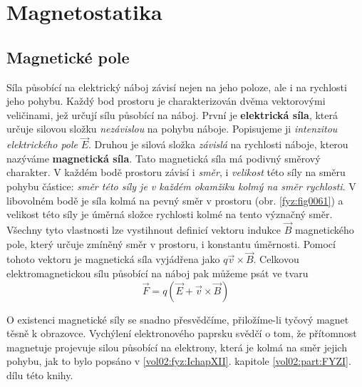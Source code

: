 \setchaptertoc
\chapter{Magnetostatika}\label{fyz:IIchapXIII}


  \section{Magnetické pole}\label{fyz:IIchapXIIIsecI}
    \cite[s.~224]{Feynman02} Síla působící na elektrický náboj závisí nejen na jeho poloze, ale i 
    na rychlosti jeho pohybu. Každý bod prostoru je charakterizován dvěma vektorovými veličinami, 
    jež určují sílu působící na náboj. První je \textbf{elektrická síla}, která určuje silovou 
    složku \emph{nezávislou} na pohybu náboje. Popisujeme ji \emph{intenzitou elektrického pole} 
    \(\vec{E}\). Druhou je silová složka \emph{závislá} na rychlosti náboje, kterou nazýváme 
    \textbf{magnetická síla}. Tato magnetická síla má podivný směrový charakter. V každém bodě 
    prostoru závisí i \emph{směr}, i \emph{velikost} této síly na směru pohybu částice: \emph{směr 
    této síly je v každém okamžiku kolmý na směr rychlosti}. V libovolném bodě je síla kolmá na 
    pevný směr v prostoru (obr. \ref{fyz:fig0061}) a velikost této síly je úměrná složce 
    rychlosti kolmé na tento význačný směr. Všechny tyto vlastnosti lze vystihnout definicí vektoru 
    indukce \(\vec{B}\) magnetického pole, který určuje zmíněný směr v prostoru, i konstantu 
    úměrnosti. Pomocí tohoto vektoru je magnetická síla vyjádřena jako \(q\vec{v}\times\vec{B}\).
    Celkovou elektromagnetickou sílu působící na náboj pak můžeme psát ve tvaru
    \begin{equation}\label{fyz:eq823}
      \vec{F} = q(\vec{E} + \vec{v}\times\vec{B})
    \end{equation} 

    O existenci magnetické síly se snadno přesvědčíme, přiložíme-li tyčový magnet těsně k obrazovce.
    Vychýlení elektronového paprsku svědčí o tom, že přítomnost magnetuje projevuje silou působící
    na elektrony, která je kolmá na směr jejich pohybu, jak to bylo popsáno v \ref{vol02:fyz:IchapXII}.
    kapitole \ref{vol02:part:FYZI}. dílu této knihy.

